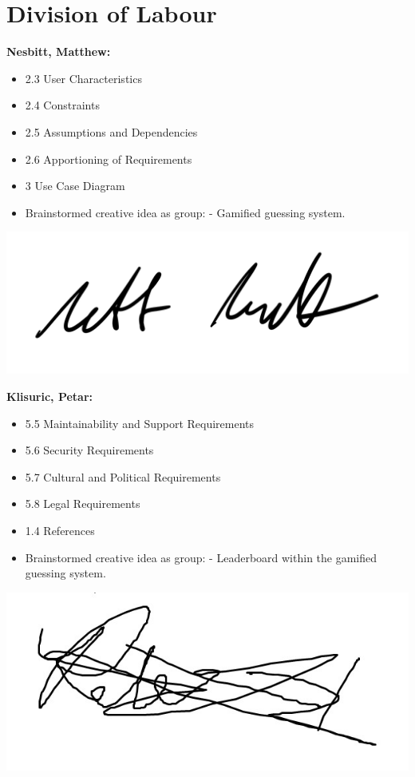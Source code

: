 \documentclass[]{article}
\begin{document}
\appendix
\section{Division of Labour}
\label{sec:division_of_labour}
\textbf{Nesbitt, Matthew:}
\begin{itemize}
	\item 2.3 User Characteristics
	\item 2.4 Constraints
	\item 2.5 Assumptions and Dependencies
	\item 2.6 Apportioning of Requirements
	\item 3 Use Case Diagram
	\item Brainstormed creative idea as group:
		\subitem - Gamified guessing system.
\end{itemize}
\includegraphics[scale=0.15]{mattsignature.jpg}

\textbf{Klisuric, Petar:}
\begin{itemize}
	\item 5.5 Maintainability and Support Requirements
	\item 5.6 Security Requirements
	\item 5.7 Cultural and Political Requirements
	\item 5.8 Legal Requirements
	\item 1.4 References
    \item Brainstormed creative idea as group:
		\subitem - Leaderboard within the gamified guessing system.
\end{itemize}
\includegraphics[scale=0.15]{petarsignature.jpg}
\end{document}
